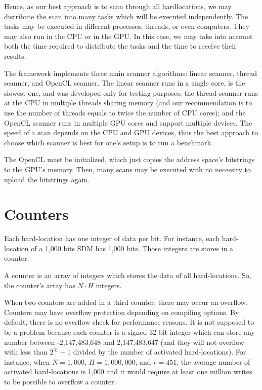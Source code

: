 Hence, as our best approach is to scan through all hardlocations, we may distribute the scan into many tasks which will be executed independently. The tasks may be executed in different processes, threads, or even computers. They may also run in the CPU or in the GPU. In this case, we may take into account both the time required to distribute the tasks and the time to receive their results.

The framework implements three main scanner algorithms: linear scanner, thread scanner, and OpenCL scanner. The linear scanner runs in a single core, is the slowest one, and was developed only for testing purposes; the thread scanner runs at the CPU in multiple threads sharing memory (and our recommendation is to use the number of threads equals to twice the number of CPU cores); and the OpenCL scanner runs in multiple GPU cores and support multiple devices. The speed of a scan depends on the CPU and GPU devices, thus the best approach to choose which scanner is best for one's setup is to run a benchmark.

The OpenCL must be initialized, which just copies the address space's bitstrings to the GPU's memory. Then, many scans may be executed with no necessity to upload the bitstrings again.


\section{Counters}

Each hard-location has one integer of data per bit. For instance, each hard-location of a 1,000 bits SDM has 1,000 bits. Those integers are stores in a counter.

A counter is an array of integers which stores the data of all hard-locations. So, the counter's array has $N \cdot H$ integers.

When two counters are added in a third counter, there may occur an overflow. Counters may have overflow protection depending on compiling options. By default, there is no overflow check for performance reasons. It is not supposed to be a problem because each counter is a signed 32-bit integer which can store any number between -2,147,483,648 and 2,147,483,647 (and they will not overflow with less than $2^{31}-1$ divided by the number of activated hard-locations). For instance, when $N=1,000$, $H=1,000,000$, and $r=451$, the average number of activated hard-locations is 1,000 and it would require at least one million writes to be possible to overflow a counter.


